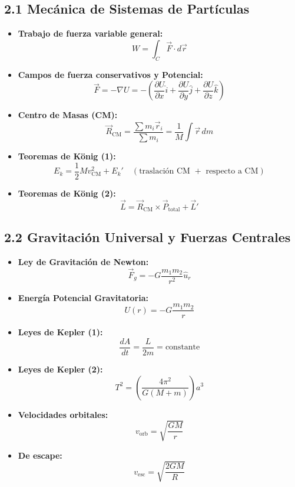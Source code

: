 \documentclass[11pt,a4paper]{article}
\begin{document}
\subsection*{2.1 Mecánica de Sistemas de Partículas}

\begin{itemize}
  \item \textbf{Trabajo de fuerza variable general:}
  \[
    W = \int_{C} \vec{F} \cdot d\vec{r}
  \]
  \item \textbf{Campos de fuerza conservativos y Potencial:}
  \[
    \vec{F} = -\nabla U = -\left( \frac{\partial U}{\partial x}\hat{i} + \frac{\partial U}{\partial y}\hat{j} + \frac{\partial U}{\partial z}\hat{k} \right)
  \]
  \item \textbf{Centro de Masas (CM):}
  \[
    \vec{R}_{\mathrm{CM}} = \frac{\sum m_i \vec{r}_i}{\sum m_i} = \frac{1}{M}\int \vec{r} \, dm
  \]
  \item \textbf{Teoremas de König (1):}
  \[
    E_k = \frac{1}{2} M v_{\mathrm{CM}}^2 + E_k' \quad (\text{traslación CM } + \text{ respecto a CM})
  \]
  \item \textbf{Teoremas de König (2):}
  \[
    \vec{L} = \vec{R}_{\mathrm{CM}} \times \vec{P}_{\text{total}} + \vec{L}'
  \]
\end{itemize}

\subsection*{2.2 Gravitación Universal y Fuerzas Centrales}

\begin{itemize}
  \item \textbf{Ley de Gravitación de Newton:}
  \[
    \vec{F}_g = -G \frac{m_1 m_2}{r^2} \hat{u}_r
  \]
  \item \textbf{Energía Potencial Gravitatoria:}
  \[
    U(r) = -G \frac{m_1 m_2}{r}
  \]
  \item \textbf{Leyes de Kepler (1):}
  \[
    \frac{dA}{dt} = \frac{L}{2m} = \text{constante}
  \]
  \item \textbf{Leyes de Kepler (2):}
  \[
    T^2 = \left( \frac{4\pi^2}{G(M + m)} \right) a^3
  \]
  \item \textbf{Velocidades orbitales:}
  \[
    v_{\mathrm{orb}} = \sqrt{\frac{GM}{r}}
  \]
  \item \textbf{De escape:}
  \[
    v_{\mathrm{esc}} = \sqrt{\frac{2GM}{R}}
  \]
\end{itemize}
\end{document}
